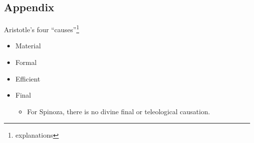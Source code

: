 \documentclass{article}
\begin{document}
\begin{spacing}{1.2}
        \subsection*{Appendix}
        Aristotle's four ``causes''\footnote{explanations}
        \begin{itemize}
            \item Material
            \item Formal
            \item Efficient
            \item Final
            \begin{itemize}
                \item For Spinoza, there is no divine final or teleological causation.
            \end{itemize}
        \end{itemize}
    \end{spacing}
    
\end{document}
